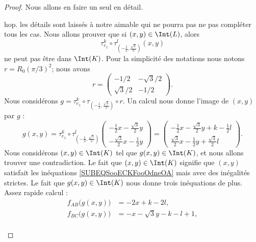 \begin{proof}
	Nous allons en faire un seul en détail.
	\begin{subproof}
		\spitem[Pour \( L=R_0(\pi/3)K\)]
            hop. les détails sont laissés à notre aimable  qui ne pourra pas ne pas compléter tous les cas.
		\spitem[Pour \( L=R_0(\pi/3)^2K\)]
		Nous allons prouver que si \( (x,y)\in \Int(L)\), alors
		\begin{equation}
			\tau_{e_1}^k\circ \tau_{(-\frac{ 1 }{2},\frac{ \sqrt{ 3 } }{2})}^l(x,y)
		\end{equation}
		ne peut pas être dans \( \Int(K)\). Pour la simplicité des notations nous notons \( r=R_0(\pi/3)^2\); nous avons
		\begin{equation}
			r=\begin{pmatrix}
				-1/2         & -\sqrt{ 3 }/2 \\
				\sqrt{ 3 }/2 & -1/2
			\end{pmatrix}.
		\end{equation}
		Nous considérons \( g=\tau_{e_1}^k\circ\tau_{(-\frac{ 1 }{2},\frac{ \sqrt{ 3 } }{2})}\circ r\). Un calcul nous donne l'image de \( (x,y)\) par \( g\) :
		\begin{equation}
			g(x,y)=\tau_{e_1}^k\circ\tau_{(-\frac{ 1 }{2},\frac{ \sqrt{ 3 } }{2})}^l\begin{pmatrix}
				-\frac{ 1 }{2}x-\frac{ \sqrt{ 3 } }{2}y \\
				-\frac{ \sqrt{ 3 } }{2}x-\frac{ 1 }{2}y
			\end{pmatrix}=\begin{pmatrix}
				-\frac{ 1 }{2}x-\frac{ \sqrt{ 3 } }{2}y+k-\frac{ 1 }{2}l \\
				\frac{ \sqrt{ 3 } }{2}x-\frac{ 1 }{2}y+\frac{ \sqrt{ 3 } }{2}l
			\end{pmatrix}.
		\end{equation}
		Nous considérons \( (x,y)\in \Int(K)\) tel que \( g(x,y)\in \Int(K)\), et nous allons trouver une contradiction. Le fait que \( (x,y)\in \Int(K)\) signifie que \( (x,y)\) satisfait les inéquations \eqref{SUBEQSooECKFooOdneOA} mais avec des inégalités strictes. Le fait que \( g(x,y)\in\Int(K)\) nous donne trois inéquations de plus. Assez rapide calcul :
		\begin{subequations}
			\begin{align}
				f_{AB}\big( g(x,y) \big) & =-2x+k-2l,                                                       \\
				f_{BC}\big( g(x,y) \big) & =-x-\sqrt{ 3 }y-k-l+1,                                           \\

\end{align}
\end{subequations}
\end{subproof}
\end{proof}
